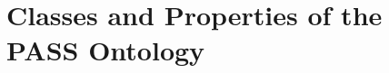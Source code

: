 \appendix

\chapter[Classes and Properties of the PASS Ontology]{Classes and Properties of the\\PASS Ontology}




